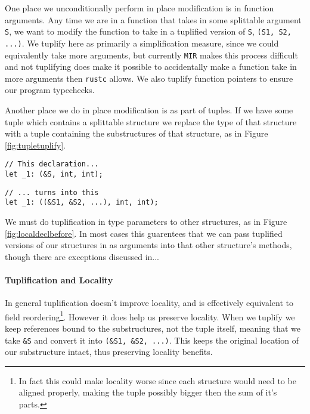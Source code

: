 \documentclass[12pt,oneside]{book}
\newcommand{\rustcname}{{\texttt{rustc}}}
\def \rustc {\rustcname{}\xspace}
\newcommand{\mirname}{{\texttt{MIR}}}
\def \mir {\mirname{}\xspace}
\begin{document}
One place we unconditionally perform in place modification is in function
arguments. Any time we are in a function that takes in some splittable
argument \texttt{S}, we want to modify the function to take 
in a tuplified version of \texttt{S}, \texttt{(S1, S2, ...)}. 
We tuplify here as primarily a simplification measure, since 
we could equivalently take more arguments, but currently
\mir makes this process difficult and
not tuplifying does make it possible to accidentally make a function
take in more arguments then \rustc allows.
We also tuplify function pointers to ensure our program typechecks.

Another place we do in place modification is as part of tuples. If we have some
tuple which contains a splittable structure we replace the type of that
structure with a tuple containing the substructures of that structure, as 
in Figure \ref{fig:tupletuplify}.

\begin{figure*}
  \begin{minipage}[t]{0.5\linewidth}
\begin{verbatim}
// This declaration...
let _1: (&S, int, int);
\end{verbatim}
  \end{minipage}
  \begin{minipage}[t]{0.5\linewidth}
\begin{verbatim}
// ... turns into this
let _1: ((&S1, &S2, ...), int, int);
\end{verbatim}
  \end{minipage}
  \caption{Simple Local Declarations Splitting $g = 3$}
  \label{fig:tupletuplify}
\end{figure*}

We must do tuplification in type parameters to other structures,
as in Figure \ref{fig:localdeclbefore}.
In most cases this guarentees that we can pass tuplified versions 
of our structures in as
arguments into that other structure's methods, though there are exceptions
discussed in... 

\paragraph{Tuplification and Locality}
In general tuplification
doesn't improve locality, and is effectively equivalent to 
field reordering\footnote{In fact this could make locality worse since each
structure would need to be aligned properly, making the tuple possibly
bigger then the sum of it's parts.}. However it does help us preserve locality.
When we tuplify we keep references bound to the substructures, not the
tuple itself, meaning that we take \texttt{\&S} and convert it into 
\texttt{(\&S1, \&S2, ...)}. This keeps the original location of our 
substructure intact, thus preserving locality benefits.
\end{document}
